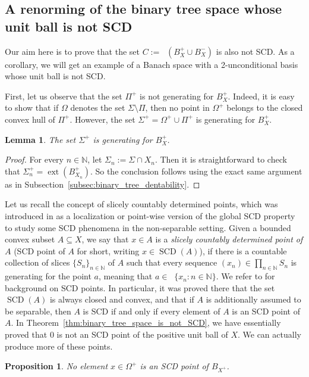 \documentclass[11pt,a4paper,reqno]{amsart}
\numberwithin{equation}{section}
\newcommand{\N}{\mathbb{N}}
\DeclareMathOperator{\cconv}{\overline{conv}}
\DeclareMathOperator{\SCD}{SCD}
\DeclareMathOperator{\ext}{ext}
\newcommand{\1}{\mathbbm{1}}
\theoremstyle{plain}
\newtheorem{lemma}[theorem]{Lemma}
\newtheorem{proposition}[theorem]{Proposition}
\theoremstyle{definition}
\begin{document}
\subsection{A renorming of the binary tree space whose unit ball is not SCD}\label{subsec:binary_tree_renorming} Our aim here is to prove that the set $C:=\cconv(B_X^+\cup B_X^-)$ is also not SCD. As a corollary, we will get an example of a Banach space with a 2-unconditional basis whose unit ball is not SCD.

First, let us observe that the set $\Pi^+$ is not generating for $B_X^+$. Indeed, it is easy to show that if $\Omega$ denotes the set $\Sigma\setminus \Pi$, then no point in $\Omega^+$ belongs to the closed convex hull of $\Pi^+$. However, the set $\Sigma^+=\Omega^+\cup\Pi^+$ is generating for $B_X^+$. 

\begin{lemma}
    The set $\Sigma^+$ is generating for $B_X^+$.
\end{lemma}

\begin{proof}
    For every $n\in\N$, let $\Sigma_n:=\Sigma\cap X_n$. Then it is straightforward to check that $\Sigma_n^+=\ext(B_{X_n}^+)$. So the conclusion follows using the exact same argument as in Subsection~\ref{subsec:binary_tree_dentability}.
\end{proof}

Let us recall the concept of slicely countably determined points, which was introduced in \cite{LLMRZ24} as a localization or point-wise version of the global SCD property to study some SCD phenomena in the non-separable setting. Given a bounded convex subset $A\subseteq X$, we say that $x\in A$ is a \emph{slicely countably determined point of $A$} (SCD point of $A$ for short, writing $x\in\SCD(A)$), if there is a countable collection of slices $\{S_n\}_{n\in\mathbb{N}}$ of $A$ such that every sequence $(x_n)\in \prod_{n\in\N} S_n$ is generating for the point $a$, meaning that $a\in\cconv\{x_n\colon n\in\mathbb{N}\}$. We refer to \cite{LLMRZ24} for background on SCD points. In particular, it was proved there that the set $\SCD(A)$ is always closed and convex, and that if $A$ is additionally assumed to be separable, then $A$ is SCD if and only if every element of $A$ is an SCD point of $A$. In Theorem~\ref{thm:binary_tree_space_is_not_SCD}, we have essentially proved that 0 is not an SCD point of the positive unit ball of $X$. We can actually produce more of these points.   

\begin{proposition}\label{prop: no x in omega+ is SCD of B_X+}
     No element $x\in\Omega^+$ is an SCD point of $B_{X^+}$. 
\end{proposition}
\end{document}
